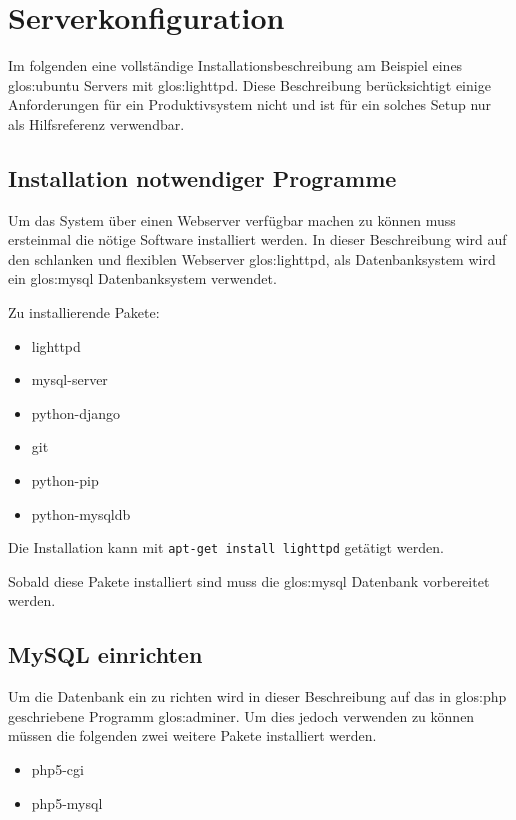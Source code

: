 \chapter{Serverkonfiguration}
Im folgenden eine vollständige Installationsbeschreibung am Beispiel eines
\Gls{glos:ubuntu} Servers mit \Gls{glos:lighttpd}. Diese
Beschreibung berücksichtigt einige Anforderungen für ein Produktivsystem nicht
und ist für ein solches Setup nur als Hilfsreferenz verwendbar. 

\section{Installation notwendiger Programme}
Um das System über einen Webserver verfügbar machen zu können muss ersteinmal
die nötige Software installiert werden. In dieser Beschreibung wird auf den
schlanken und flexiblen Webserver \Gls{glos:lighttpd}, als Datenbanksystem wird
ein \Gls{glos:mysql} Datenbanksystem verwendet.

Zu installierende Pakete:
\begin{itemize}
  \item lighttpd
  \item mysql-server
  \item python-django
  \item git
  \item python-pip
  \item python-mysqldb
\end{itemize}
Die Installation kann mit \zB \lstinline{apt-get install lighttpd} getätigt
werden.

Sobald diese Pakete installiert sind muss die \Gls{glos:mysql} Datenbank
vorbereitet werden.

\section{MySQL einrichten}
Um die Datenbank ein zu richten wird in dieser Beschreibung auf das in
\Gls{glos:php} geschriebene Programm \Gls{glos:adminer}. Um dies jedoch
verwenden zu können müssen die folgenden zwei weitere Pakete installiert
werden.

\begin{itemize}
  \item php5-cgi
  \item php5-mysql
\end{itemize}


